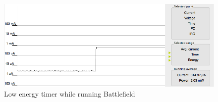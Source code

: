 \begin{figure}[H]
  \centering
  \includegraphics[clip, trim=0cm 0cm 0cm 0cm, width=12cm]{fig/energyBattlefield.png}
  \caption{Low energy timer while running Battlefield}
\end{figure}
